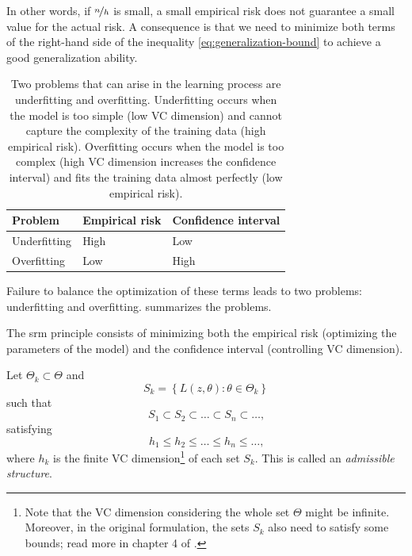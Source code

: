 In other words, if $\nicefrac{n}{h}$ is small, a small empirical risk does not guarantee a small value
for the actual risk.  A consequence is that we need to minimize both terms of the
right-hand side of the inequality \cref{eq:generalization-bound} to achieve a good
generalization ability.

\begin{table}
  \centering
  \begin{tabular}{lll}
    \toprule
    \textbf{Problem} & \textbf{Empirical risk} & \textbf{Confidence interval} \\
    \midrule
    Underfitting & High & Low \\
    Overfitting & Low & High \\
    \bottomrule
  \end{tabular}
  \caption{
  Two problems that can arise in the learning process are underfitting and overfitting.
  Underfitting occurs when the model is too simple (low VC dimension) and cannot capture
  the complexity of the training data (high empirical risk).  Overfitting occurs when the
  model is too complex (high VC dimension increases the confidence interval) and fits the
  training data almost perfectly (low empirical risk).
  }
  \label{tab:overfit-underfit}
\end{table}

Failure to balance the optimization of these terms leads to two problems: underfitting and
overfitting.   summarizes the problems.

The \gls{srm} principle consists of minimizing both the empirical risk (optimizing the
parameters of the model) and the confidence interval (controlling VC dimension).

Let $\Theta_k \subset \Theta$ and
\[
  S_k = \left\{ L(z, \theta) : \theta \in \Theta_k \right\}
\]
such that
\[
  S_1 \subset S_2 \subset \dots \subset S_n \subset \dots\text{,}
\]
satisfying
\[
  h_1 \leq h_2 \leq \dots \leq h_n \leq \dots\text{,}
\]
where $h_k$ is the finite VC dimension\footnote{Note that the VC dimension considering the
whole set $\Theta$ might be infinite.  Moreover, in the original formulation, the sets
$S_k$ also need to satisfy some bounds; read more in chapter 4 of .}
of each set $S_k$.  This is called an \emph{admissible structure}.

